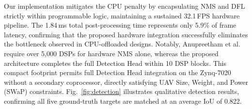 \documentclass{svproc}
\begin{document}
\begin{table}[H]
\centering
\caption{Architectural Benchmark of Hardware Post-Processing Implementations.}
\label{tab:comp}
\end{table}

Our implementation mitigates the CPU penalty by encapsulating NMS and DFL strictly within programmable logic, maintaining a sustained 32.1\,FPS hardware pipeline. The 1.84\,ms total post-processing time represents only 5.9\% of frame latency, confirming that the proposed hardware integration successfully eliminates the bottleneck observed in CPU-offloaded designs. Notably, Anupreetham et al.~\cite{anupreetham2024nms} require over 5,000 DSPs for hardware NMS alone, whereas the proposed architecture completes the full Detection Head within 10 DSP blocks. This compact footprint permits full Detection Head integration on the Zynq-7020 without a secondary coprocessor, directly satisfying UAV Size, Weight, and Power (SWaP) constraints. Fig.~\ref{fig:detection} illustrates qualitative detection results, confirming all five ground-truth targets are matched at an average IoU of 0.822.
\end{document}
